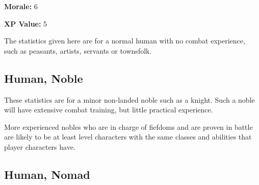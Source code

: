\begin{multicols*}{2}
{\textbf{Morale:} 6

\textbf{XP Value:} 5}

The statistics given here are for a normal human with no combat experience, such as peasants, artists, servants or townsfolk.

\subsection{Human, Noble}

These statistics are for a minor non-landed noble such as a knight. Such a noble will have extensive combat training, but little practical experience.

More experienced nobles who are in charge of fiefdoms and are proven in battle are likely to be at least  level characters with the same classes and abilities that player characters have.

\subsection{Human, Nomad}
\end{multicols*}
